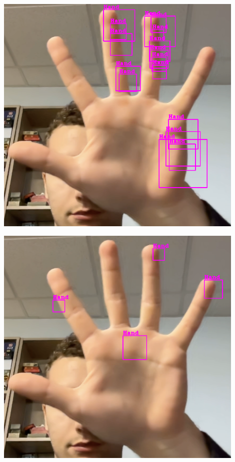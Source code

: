 \documentclass[11pt]{article}
\begin{document}
\begin{minipage}{0.45\textwidth}
    \centering
    \includegraphics[width=0.9\textwidth]{images/cascade0.png}
    \label{fig:res_cascade0}
\end{minipage}
\begin{minipage}{0.45\textwidth}
    \centering
    \includegraphics[width=0.9\textwidth]{images/cascade1.png}
    \label{fig:res_cascade1}
\end{minipage}
\end{document}
